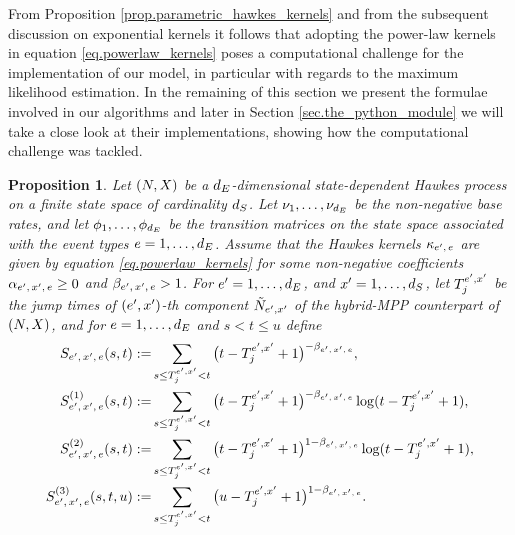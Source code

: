 \documentclass[10pt, article,table]{article}
\newtheorem{prop}[thm]{Proposition}
\begin{document}
From Proposition \ref{prop.parametric_hawkes_kernels} and from the subsequent discussion on exponential kernels it follows that adopting the power-law kernels in equation \eqref{eq.powerlaw_kernels} poses a computational challenge for the implementation of our model, in particular with regards to the maximum likelihood estimation. In the remaining of this section we present the formulae involved in our algorithms and later in Section \ref{sec.the_python_module} we will take a close look at their implementations, showing how the computational challenge was tackled. 

\begin{prop}\label{prop.intensity_and_compensator_powerlaw}
 Let $(\multiCountingProc,\stateVariable)$ be a $\numEventTypes$-dimensional state-dependent Hawkes process on a finite state space of cardinality $\numStates$. Let $\baseRate_1, \dots, \baseRate_{\numEventTypes}$ be the non-negative base rates, and let $\transProb_1, \dots,\transProb_{\numEventTypes}$ be the transition matrices on the state space associated with the event types $e=1, \dots, \numEventTypes$. Assume that the Hawkes kernels $\hawkesKernel\subscriptee$ are given by equation \eqref{eq.powerlaw_kernels} for some non-negative coefficients $\impCoef\subscriptexe \geq 0$ and $\decCoef\subscriptexe > 1$.  For $\eone = 1,\dots,\numEventTypes$, and $\xone=1,\dots,\numStates$, let $\arrivalTimes[\eone,\xone]_j$ be the jump times of $(\eone,\xone)$-th component $\hybridHawkes_{\eone,\xone}$ of the hybrid-MPP counterpart of $(\multiCountingProc,\stateVariable)$, and for $e = 1,\dots,\numEventTypes$ and $s<t\leq u$ define
 \begin{equation}\label{eq.definitions_of_ESSE}
  \begin{split}
   \ESSE\subscriptexe(s,t):=& \sum_{s\leq \arrivalTimes[\eone,\xone]_j < t}\big(t-\arrivalTimes[\eone,\xone]_j +1\big)^{-\decCoef\subscriptexe},
   \\
   \ESSEone\subscriptexe(s,t):=& \sum_{s\leq \arrivalTimes[\eone,\xone]_j < t}\big(t-\arrivalTimes[\eone,\xone]_j +1\big)^{-\decCoef\subscriptexe}\log(t-\arrivalTimes[\eone,\xone]_j +1),
   \\
   \ESSEtwo\subscriptexe(s,t):=& \sum_{s\leq \arrivalTimes[\eone,\xone]_j < t}\big(t-\arrivalTimes[\eone,\xone]_j +1\big)^{1-\decCoef\subscriptexe}\log(t-\arrivalTimes[\eone,\xone]_j +1),
   \\
   \ESSEthree\subscriptexe(s,t,u):=& \sum_{s\leq \arrivalTimes[\eone,\xone]_j < t}\big(u-\arrivalTimes[\eone,\xone]_j +1\big)^{1-\decCoef\subscriptexe}.

\end{split}
\end{equation}
\end{prop}
\end{document}
